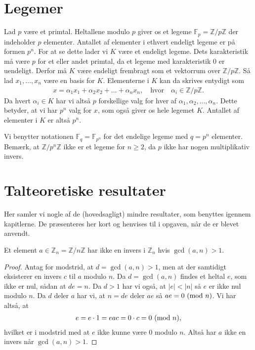 \appendix
\chapter{Legemer}
\label{appendiks_legemer}
Lad $p$ være et primtal. Heltallene modulo $p$ giver os et legeme $\mathbb{F}_p = \mathbb{Z}/p\mathbb{Z}$ der indeholder $p$ elementer. Antallet af elementer i ethvert endeligt legeme er på formen $p^n$. For at se dette lader vi $K$ være et endeligt legeme. Dets karakteristik må være $p$ for et eller andet primtal, da et legeme med karakteristik $0$ er uendeligt. Derfor må $K$ være endeligt frembragt som et vektorrum over $\mathbb{Z}/p\mathbb{Z}$. Så lad $x_1, \ldots, x_n$ være en basis for $K$. Elementerne i $K$ kan da skrives entydigt som
\begin{align*}
	x= \alpha_1 x_1 + \alpha_2 x_2 + \ldots + \alpha_n x_n, \quad \text{hvor} \quad \alpha_i \in \mathbb{Z}/p\mathbb{Z}.
\end{align*}
Da hvert $\alpha_i \in K$ har vi altså $p$ forskellige valg for hver af $\alpha_1, \alpha_2, \ldots, \alpha_n$. Dette betyder, at vi har $p^n$ valg for $x$, som også giver os hele legemet $K$. Antallet af elementer i $K$ er altså $p^n$. 

Vi benytter notationen $\mathbb{F}_q = \mathbb{F}_{p^n}$ for det endelige legeme med $q=p^n$ elementer. Bemærk, at $\mathbb{Z}/p^n \mathbb{Z}$ ikke er et legeme for $n \geq 2$, da $p$ ikke har nogen multiplikativ invers.



\chapter{Talteoretiske resultater}
Her samler vi nogle af de (hovedsagligt) mindre resultater, som benyttes igennem kapitlerne. De præsenteres her kort og henvises til  i opgaven, når de er blevet anvendt.

\begin{proposition}
\label{inverse_exists_not}
Et element $a \in \mathbb{Z}_n = \mathbb{Z}/n\mathbb{Z}$ har ikke en invers i $\mathbb{Z}_n$ hvis $\gcd(a, n) > 1$. 
\end{proposition}
\begin{proof}
Antag for modstrid, at $d = \gcd(a, n) > 1$, men at der samtidigt eksisterer en invers $c$ til $a$ modulo $n$. Da $d = \gcd(a, n)$ findes et heltal $e$, som ikke er nul, sådan at $de = n$. Da $d >1$ har vi også, at $|e| < |n|$ så $e$ er ikke nul modulo $n$. Da $d$ deler $a$ har vi, at $n = de$ deler $ae$ så $ae = 0 \ (\mathrm{mod} \ n)$. Vi har altså, at
\begin{align*}
	e = e \cdot 1 = eac = 0 \cdot c = 0 \ (\mathrm{mod} \ n),
\end{align*}
hvilket er i modstrid med at $e$ ikke kunne være $0$ modulo $n$. Altså har $a$ ikke en invers når $\gcd(a, n) > 1$.
\end{proof}

